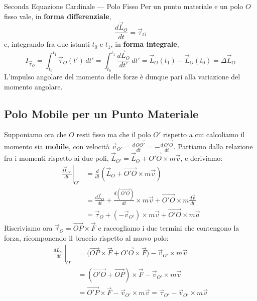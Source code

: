 \begin{teorema}{Seconda Equazione Cardinale --- Polo Fisso}
Per un punto materiale e un polo $O$ fisso vale, in \textbf{forma differenziale},
\begin{equation}
    \frac{d\vec{L}_O}{dt} = \vec{\tau}_O
\end{equation}
e, integrando fra due istanti $t_0$ e $t_1$, in \textbf{forma integrale},
\begin{equation}
    I_{\vec{\tau}_O} = \int_{t_0}^{t_1} \vec{\tau}_O(t') \, dt'
    = \int_{t_0}^{t_1} \frac{d\vec{L}_O}{dt'} \, dt'
    = \vec{L}_O(t_1) - \vec{L}_O(t_0) = \Delta\vec{L}_O
\end{equation}
L'impulso angolare del momento delle forze è dunque pari alla variazione del momento angolare.
\end{teorema}

\subsection{Polo Mobile per un Punto Materiale}

Supponiamo ora che $O$ resti fisso ma che il polo $O'$ rispetto a cui calcoliamo il momento sia \textbf{mobile}, con velocità $\vec{v}_{O'} = \frac{d\,\vec{OO'}}{dt} = -\frac{d\,\vec{O'O}}{dt}$. Partiamo dalla relazione fra i momenti rispetto ai due poli, $\vec{L}_{O'} = \vec{L}_O + \vec{O'O} \times m\vec{v}$, e deriviamo:
\begin{align}
    \left. \frac{d\vec{L}_{O'}}{dt} \right|_{O'}
    &= \frac{d}{dt}\left( \vec{L}_O + \vec{O'O} \times m\vec{v} \right) \\
    &= \frac{d\vec{L}_O}{dt} + \frac{d(\vec{O'O})}{dt} \times m\vec{v} + \vec{O'O} \times m\frac{d\vec{v}}{dt} \\
    &= \vec{\tau}_O + (-\vec{v}_{O'}) \times m\vec{v} + \vec{O'O} \times m\vec{a}
\end{align}
Riscriviamo ora $\vec{\tau}_O = \vec{OP} \times \vec{F}$ e raccogliamo i due termini che contengono la forza, ricomponendo il braccio rispetto al nuovo polo:
\begin{align}
    \left. \frac{d\vec{L}_{O'}}{dt} \right|_{O'}
    &= \big(\vec{OP} \times \vec{F} + \vec{O'O} \times \vec{F}\big) - \vec{v}_{O'} \times m\vec{v} \\
    &= (\vec{O'O} + \vec{OP}) \times \vec{F} - \vec{v}_{O'} \times m\vec{v} \\
    &= \vec{O'P} \times \vec{F} - \vec{v}_{O'} \times m\vec{v}
    = \vec{\tau}_{O'} - \vec{v}_{O'} \times m\vec{v}
\end{align}

